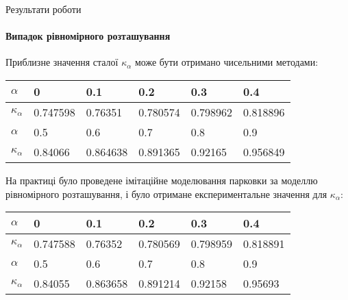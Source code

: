 \begin{frame}{Результати роботи}
	\framesubtitle{Випадок рівномірного розташування}
	\manimate
	Приблизне значення сталої $\kappa_\alpha$ може бути отримано чисельними методами:
\begin{table}
	\centering
	\scriptsize
\begin{tabular}{|p{}|p{}|p{}|p{}|p{}|p{}|}
	\hline
	$\alpha$ & 0 & 0.1 & 0.2 & 0.3 & 0.4 \\
	\hline
	$\kappa_\alpha$ & 0.747598 &0.76351 &0.780574 &0.798962 &0.818896  \\
	\hline
	\hline
	$\alpha$  & 0.5 & 0.6 & 0.7 & 0.8 & 0.9\\
	\hline
	$\kappa_\alpha$  &0.84066 &0.864638 &0.891365 &0.92165 &0.956849 \\
	\hline
\end{tabular}
\end{table}

	На практиці було проведене імітаційне моделювання парковки за моделлю рівномірного розташування, і було отримане експериментальне значення для $\kappa_\alpha$:
\begin{table}
	\centering
	\scriptsize
\begin{tabular}{|p{}|p{}|p{}|p{}|p{}|p{}|}
	\hline
	$\alpha$ & 0 & 0.1 & 0.2 & 0.3 & 0.4 \\
	\hline
	$\kappa_\alpha$ & 0.747588 &0.76352 &0.780569 &0.798959 &0.818891  \\
	\hline
	\hline
	$\alpha$  & 0.5 & 0.6 & 0.7 & 0.8 & 0.9\\
	\hline
	$\kappa_\alpha$  &0.84055 &0.863658 &0.891214 &0.92158 &0.95693 \\
	\hline
\end{tabular}
\end{table}
\end{frame}



